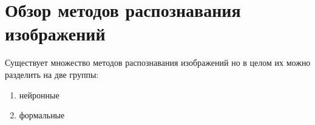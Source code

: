 \chapter{Обзор методов распознавания изображений} \label{chapt2}
Существует множество методов распознавания изображений но в целом их можно разделить на две группы:
\begin{enumerate}
\item нейронные
\item формальные
\end{enumerate}
%
%
%
%
%
%
